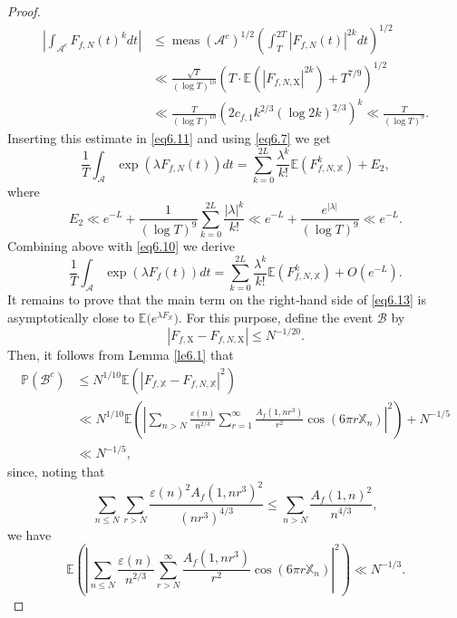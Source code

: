 \documentclass[10pt,a4paper]{amsart}
\begin{document}
\begin{proof}
\[\begin{aligned}
\left|\int_{\mathcal{A}^c} F_{f,N}(t)^k d t\right| & \leqslant \operatorname{meas}\left(\mathcal{A}^c\right)^{1 / 2}\left(\int_T^{2 T}\left|F_{f,N}(t)\right|^{2 k} d t\right)^{1 / 2} \\
& \ll \frac{\sqrt{T}}{(\log T)^{10}}\left(T \cdot \mathbb{E}\left(\left|F_{f,N, \mathrm{X}}\right|^{2 k}\right)+T^{7 / 9}\right)^{1 / 2} \\
& \ll \frac{T}{(\log T)^{10}}\left(2 c_{f,1} k^{2 / 3}\left(\log 2k\right)^{2/3}\right)^k \ll \frac{T}{(\log T)^9} .
\end{aligned}
\]
Inserting this estimate in \eqref{eq6.11} and using  \eqref{eq6.7} we get
\begin{equation}\label{eq6.12}
    \frac{1}{T} \int_{\mathcal{A}} \exp \left(\lambda F_{f,N}(t)\right) d t=\sum_{k=0}^{2 L} \frac{\lambda^k}{k!} \mathbb{E}\left(F_{f,N, \mathbb{X}}^k\right)+E_2,
\end{equation}
where
\[
E_2 \ll e^{-L}+\frac{1}{(\log T)^9} \sum_{k=0}^{2 L} \frac{|\lambda|^k}{k!} \ll e^{-L}+\frac{e^{|\lambda|}}{(\log T)^9} \ll e^{-L} .
\]
Combining above with \eqref{eq6.10} we derive
\begin{equation}\label{eq6.13}
    \frac{1}{T} \int_{\mathcal{A}} \exp (\lambda F_f(t)) d t=\sum_{k=0}^{2 L} \frac{\lambda^k}{k!} \mathbb{E}\left(F_{f,N, \mathbb{X}}^k\right)+O\left(e^{-L}\right).
\end{equation}
It remains to prove that the main term on the right‑hand side of \eqref{eq6.13} is asymptotically close to $\mathbb{E}\bigl(e^{\lambda F_{\mathbb{X}}}\bigr)$. For this purpose, define the event $\mathcal{B}$ by
\[
\left|F_{f,\mathrm{X}}-F_{f,N, \mathrm{X}}\right| \leqslant N^{-1 / 20} .
\]
Then, it follows from Lemma \ref{le6.1} that
\begin{equation}\label{eq6.14}
    \begin{aligned}
\mathbb{P}\left(\mathcal{B}^c\right) & \leqslant N^{1 / 10} \mathbb{E}\left(\left|F_{f,\mathbb{X}}-F_{f,N, \mathbb{X}}\right|^2\right) \\
& \ll N^{1 / 10} \mathbb{E}\left(\left|\sum_{n>N} \frac{\varepsilon(n)}{n^{2/3}} \sum_{r=1}^{\infty} \frac{A_f\left(1,n r^3\right)}{r^{2}} \cos \left(6 \pi r \mathbb{X}_n\right)\right|^2\right)+N^{-1 /5} \\
& \ll N^{-1 / 5},
\end{aligned}
\end{equation}
since, noting that
\[
\sum_{n\leqslant N} \sum_{r> N}\frac{\varepsilon(n)^2A_f(1,nr^3)^2}{\left(nr^3\right)^{4/3}}\leqslant \sum_{n>N}\frac{A_f(1,n)^2}{n^{4/3}}, 
\]
we have
\[
 \mathbb{E}\left(\left|\sum_{n\leqslant N} \frac{\varepsilon(n)}{n^{2/3}} \sum_{r>N}^{\infty} \frac{A_f\left(1,n r^3\right)}{r^{2}} \cos \left(6 \pi r \mathbb{X}_n\right)\right|^2\right)
 \ll N^{-1 /3} .
\]


\end{proof}
\end{document}

